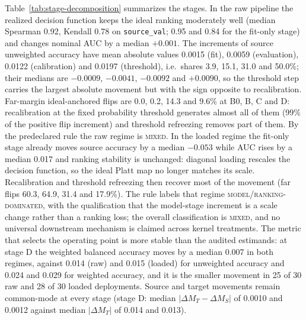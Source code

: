 \documentclass[11pt,a4paper]{article}
\begin{document}
Table~\ref{tab:stage-decomposition} summarizes the stages. In the raw
pipeline the realized decision function keeps the ideal ranking moderately
well (median Spearman 0.92, Kendall 0.78 on \texttt{source\_val}; 0.95 and
0.84 for the fit-only stage) and changes nominal AUC by a median $+0.001$. The
increments of source unweighted accuracy have mean absolute values 0.0015
(fit), 0.0059 (evaluation), 0.0122 (calibration) and 0.0197 (threshold), i.e.\
shares 3.9, 15.1, 31.0 and 50.0\%; their medians are $-0.0009$, $-0.0041$,
$-0.0092$ and $+0.0090$, so the threshold step carries the largest absolute
movement but with the sign opposite to recalibration. Far-margin
ideal-anchored flips are 0.0, 0.2, 14.3 and 9.6\% at B0, B, C and D:
recalibration at the fixed probability threshold generates almost all of them
(99\% of the positive flip increment) and threshold refreezing removes part of
them. By the predeclared rule the raw regime is \textsc{mixed}. In the
loaded regime the fit-only stage already moves source accuracy by a median
$-0.053$ while AUC rises by a median 0.017 and ranking stability is unchanged:
diagonal loading rescales the decision function, so the ideal Platt map no
longer matches its scale. Recalibration and threshold refreezing then recover
most of the movement (far flips 60.3, 64.9, 31.4 and 17.9\%). The rule labels
that regime \textsc{model/ranking-dominated}, with the qualification that the
model-stage increment is a scale change rather than a ranking loss; the
overall classification is \textsc{mixed}, and no universal downstream
mechanism is claimed across kernel treatments. The metric that selects the
operating point is more stable than the audited estimands: at stage D the
weighted balanced accuracy moves by a median 0.007 in both regimes, against
0.014 (raw) and 0.015 (loaded) for unweighted accuracy and 0.024 and 0.029
for weighted accuracy, and it is the smaller movement in 25 of 30 raw and 28
of 30 loaded deployments. Source and target movements remain common-mode at
every stage (stage D: median $|\Delta M_T-\Delta M_S|$ of 0.0010 and 0.0012
against median $|\Delta M_T|$ of 0.014 and 0.013).
\end{document}
